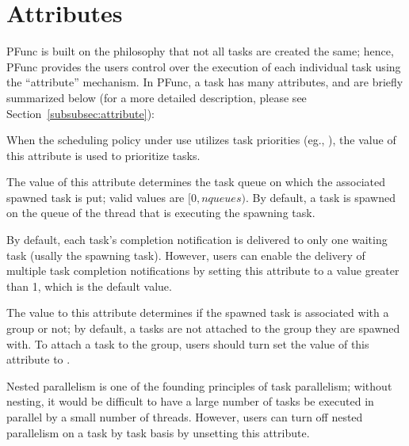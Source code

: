 \section{Attributes}
\label{sec:attribute}
%
PFunc is built on the philosophy that not all tasks are created the same;
hence, PFunc provides the users control over the execution of each individual
task using the ``attribute'' mechanism. 
%
In PFunc, a task has many attributes, and are briefly summarized below (for a 
more detailed description, please see Section~\ref{subsubsec:attribute}):

\begin{list}{}{\leftmargin=1em}
\item {} When the scheduling policy under use utilizes task
priorities (eg., ), the value of this attribute is used to
prioritize tasks.
%
\item {} The value of this attribute determines the task
queue on which the associated spawned task is put; valid values are
$[0,nqueues)$.
%
By default, a task is spawned on the queue of the thread that is executing the
spawning task. 
%
\item {} By default, each task's completion notification is
delivered to only one waiting task (usally the spawning task). 
%
However, users can enable the delivery of multiple task completion
notifications by setting this attribute to a value greater than 1, which is the
default value. 
%
\item {} The value to this attribute determines if the spawned
task is associated with a group or not; by default, a tasks are not attached to
the group they are spawned with. 
%
To attach a task to the group, users should turn set the value of this
attribute to .
%
\item {} Nested parallelism is one of the founding principles of
task parallelism; without nesting, it would be difficult to have a large number
of tasks be executed in parallel by a small number of threads. 
%
However, users can turn off nested parallelism on a task by task basis by
unsetting this attribute.
\end{list}

